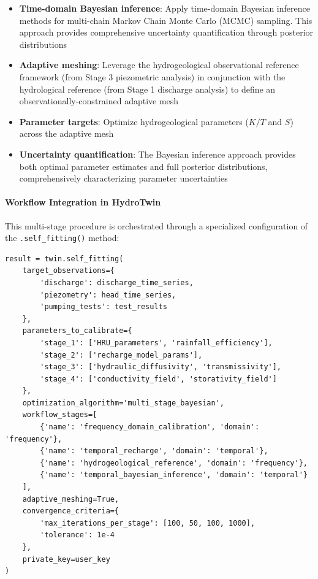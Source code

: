 \begin{itemize}
\item \textbf{Time-domain Bayesian inference}: Apply time-domain Bayesian inference methods for multi-chain Markov Chain Monte Carlo (MCMC) sampling. This approach provides comprehensive uncertainty quantification through posterior distributions

\item \textbf{Adaptive meshing}: Leverage the hydrogeological observational reference framework (from Stage 3 piezometric analysis) in conjunction with the hydrological reference (from Stage 1 discharge analysis) to define an observationally-constrained adaptive mesh

\item \textbf{Parameter targets}: Optimize hydrogeological parameters ($K/T$ and $S$) across the adaptive mesh

\item \textbf{Uncertainty quantification}: The Bayesian inference approach provides both optimal parameter estimates and full posterior distributions, comprehensively characterizing parameter uncertainties
\end{itemize}

\paragraph{Workflow Integration in HydroTwin}

This multi-stage procedure is orchestrated through a specialized configuration of the \texttt{.self\_fitting()} method:

\begin{verbatim}
result = twin.self_fitting(
    target_observations={
        'discharge': discharge_time_series,
        'piezometry': head_time_series,
        'pumping_tests': test_results
    },
    parameters_to_calibrate={
        'stage_1': ['HRU_parameters', 'rainfall_efficiency'],
        'stage_2': ['recharge_model_params'],
        'stage_3': ['hydraulic_diffusivity', 'transmissivity'],
        'stage_4': ['conductivity_field', 'storativity_field']
    },
    optimization_algorithm='multi_stage_bayesian',
    workflow_stages=[
        {'name': 'frequency_domain_calibration', 'domain': 'frequency'},
        {'name': 'temporal_recharge', 'domain': 'temporal'},
        {'name': 'hydrogeological_reference', 'domain': 'frequency'},
        {'name': 'temporal_bayesian_inference', 'domain': 'temporal'}
    ],
    adaptive_meshing=True,
    convergence_criteria={
        'max_iterations_per_stage': [100, 50, 100, 1000],
        'tolerance': 1e-4
    },
    private_key=user_key
)
\end{verbatim}

